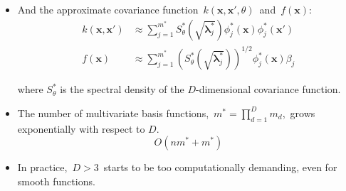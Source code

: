 \documentclass[8pt]{beamer} %
\begin{document}
\begin{frame}

\begin{itemize}\setlength\itemsep{4mm}
\item And the approximate covariance function\, $k(\bm{x},\bm{x}',\theta)$\, and\, $f(\bm{x})$:
%
\begin{align*}
k(\bm{x},\bm{x}') &\approx \sum_{j=1}^{m^{\ast}} 
S^{\ast}_{\theta}\left(\sqrt{\bm{\lambda}^{\ast}_j}\right)
\phi^{\ast}_j(\bm{x}) \phi^{\ast}_j(\bm{x}') \\
%
f(\bm{x}) &\approx \sum_{j=1}^{m^{\ast}} 
\left( S^{\ast}_{\theta} \left(\sqrt{\bm{\lambda}^{\ast}_j} \right)\right)^{1/2}
\phi^{\ast}_j(\bm{x}) \beta_j
\end{align*}

where $S^{\ast}_{\theta}$ is the spectral density of the $D$-dimensional covariance function.

\vspace{2mm}
\item The number of multivariate basis functions,\, $m^{\ast} = \prod_{d=1}^{D} m_d$,\, {\color{navyblue} grows exponentially} with respect to $D$.\\[-2mm]
 \[O(nm^*+m^*)\]

\item In practice,\, $D>3$\, starts to be too computationally demanding, even for smooth functions.

\end{itemize}
\end{frame}
\end{document}
